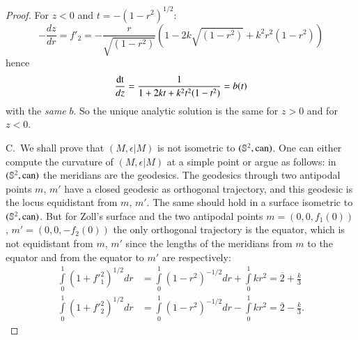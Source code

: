 \begin{proof}
For $z<0$ and $t=-(1-r^{2})^{1/2}$:
$$
-\frac{dz}{dr}=f'_{2}=-\frac{r}{\sqrt{(1-r^{2})}}(1-2k\sqrt{(1-r^{2})}+k^{2}r^{2}(1-r^{2})) 
$$
hence
$$
\frac{\operatorname{dt}}{dz}=\frac{1}{1+2kt+k^{2}t^{2}(1-t^{2})}=b(t)
$$
with the {\em same} $b$. So the unique analytic solution is the same
for $z>0$ and for $z<0$.

C.~We shall prove that $(M,\epsilon|M)$ is not isometric to
$(\mathbb{S}^{2},\operatorname{can})$. One can either compute the curvature of
$(M,\epsilon|M)$ at a simple point or argue as follows: in
$(\mathbb{S}^{2},\operatorname{can})$ the meridians are the geodesics. The geodesics
through two antipodal points $m$, $m'$ have a closed geodesic as
orthogonal trajectory, and this geodesic is the locus equidistant from
$m$, $m'$. The same should hold in a surface isometric to
$(\mathbb{S}^{2},\operatorname{can})$. But for Zoll's surface and the two antipodal
points $m=(0,0,f_{1}(0))$, $m'=(0,0,-f_{2}(0))$ the only orthogonal
trajectory is the equator, which is not equidistant from $m$, $m'$
since the lengths of the meridians from $m$ to the equator and from
the equator to $m'$ are respectively:
\begin{align*}
\int\limits^{1}_{0}(1+{f'}^{2}_{1})^{1/2}dr &=
\int\limits^{1}_{0}(1-r^{2})^{-1/2}dr+\int\limits^{1}_{0}kr^{2}=\overline{2}+\frac{k}{3}\\
\int\limits^{1}_{0}(1+{f'}^{2}_{2})^{1/2}dr &= \int\limits^{1}_{0}(1-r^{2})^{-1/2}dr-\int\limits^{1}_{0}kr^{2}=\overline{2}-\frac{k}{3}.
\end{align*}\pageoriginale
\end{proof}

\setcounter{subsection}{9}

\subsection{}\label{chap4:remas4.8.10}

